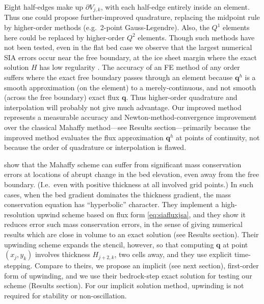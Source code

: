 \documentclass[twocolumn,letterpaper]{igs}
\newcommand\bq{\mathbf{q}}
\begin{document}
Eight half-edges make up $\partial V_{j,k}$, with each half-edge entirely inside an element.  Thus one could propose further-improved quadrature, replacing the midpoint rule by higher-order methods (e.g.~2-point Gauss-Legendre).  Also, the $Q^1$ elements here could be replaced by higher-order $Q^2$ elements.  Though such methods have not been tested, even in the flat bed case we observe that the largest numerical SIA errors occur near the free boundary, at the ice sheet margin where the exact solution $H$ has low regularity \citep{Bueleretal2005}.  The accuracy of an FE method of any order suffers where the exact free boundary passes through an element because $\bq^h$ is a smooth approximation (on the element) to a merely-continuous, and not smooth (across the free boundary) exact flux $\bq$.  Thus higher-order quadrature and interpolation will probably not give much advantage.  Our improved method represents a measurable accuracy and Newton-method-convergence improvement over the classical Mahaffy method---see Results section---primarily because the improved method evaluates the flux approximation $\bq^h$ at points of continuity, not because the order of quadrature or interpolation is flawed.

\cite{JaroschSchoofAnslow2013} show that the Mahaffy scheme can suffer from significant mass conservation errors at locations of abrupt change in the bed elevation, even away from the free boundary.  (I.e.~even with positive thickness at all involved grid points.)  In such cases, when the bed gradient dominates the thickness gradient, the mass conservation equation has ``hyperbolic'' character.  They implement a high-resolution upwind scheme \citep{LeVeque2002} based on flux form \eqref{eq:siafluxjsa}, and they show it reduces error such mass conservation errors, in the sense of giving numerical results which are close in volume to an exact solution (see Results section).  Their upwinding scheme expands the stencil, however, so that computing $\bq$ at point $(x_j,y_k)$ involves thickness $H_{j+2,k}$, two cells away, and they use explicit time-stepping.  Compare to theirs, we propose an implicit (see next section), first-order form of upwinding, and we use their bedrock-step exact solution for testing our scheme (Results section).  For our implicit solution method, upwinding is not required for stability or non-oscillation.
\end{document}
